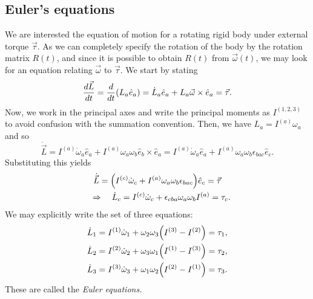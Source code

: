 \documentclass{article}
\begin{document}
\subsection{Euler's equations}
We are interested the equation of motion for a rotating rigid body under external torque $\vec{\tau}$. As we can completely specify the rotation of the body by the rotation matrix $R(t)$, and since it is possible to obtain $R(t)$ from $\vec{\omega}(t)$, we may look for an equation relating $\vec{\omega}$ to $\vec{\tau}$. We start by stating
\begin{equation}
    \dv{\vec{L}}{t} = \dv{}{t}\qty(L_a \hat{e}_a) = \dot{L}_a \hat{e}_a + L_a \vec{\omega} \times \hat{e}_a = \vec{\tau}.
\end{equation}
Now, we work in the principal axes and write the principal moments as $I^{(1,2,3)}$ to avoid confusion with the summation convention. Then, we have $L_a = I^{(a)} \omega_a$ and so
\begin{equation}
    \dot{\vec{L}} = I^{(a)} \dot{\omega}_a \hat{e}_a + I^{(a)} \omega_a \omega_b \hat{e}_b \times \hat{e}_a = I^{(a)} \dot{\omega}_a \hat{e}_a + I^{(a)} \omega_a \omega_b \epsilon_{bac} \hat{e}_c.
\end{equation}
Substituting this yields
\begin{gather}
    \dot{\vec{L}} = \qty(I^{(c)} \dot{\omega}_c + I^{(a)} \omega_a \omega_b \epsilon_{bac}) \hat{e}_c = \vec{\tau} \\
    \quad \Rightarrow \quad \dot{L}_c = I^{(c)} \dot{\omega}_c + \epsilon_{cba} \omega_a \omega_b I^{(a)} = \tau_c.
\end{gather}
We may explicitly write the set of three equations:
\begin{gather}
    \dot{L}_1 = I^{(1)} \dot{\omega}_1 + \omega_2 \omega_3 \qty(I^{(3)} - I^{(2)}) = \tau_1, \\
    \dot{L}_2 = I^{(2)} \dot{\omega}_2 + \omega_3 \omega_1 \qty(I^{(1)} - I^{(3)}) = \tau_2, \\
    \dot{L}_3 = I^{(3)} \dot{\omega}_3 + \omega_1 \omega_2 \qty(I^{(2)} - I^{(1)}) = \tau_3.
\end{gather}
These are called the \textit{Euler equations.}
\end{document}
